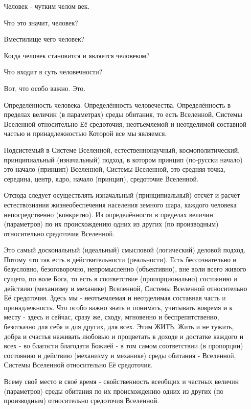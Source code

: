\begin{itemize}
Человек - чутким челом век.

Что это значит, человек?

Вместилище чего человек?

Когда человек становится и является человеком?

Что входит в суть человечности?

Вот, что особо важно. Это.

Определённость человека. Определённость человечества. Определённость в пределах
величин (в параметрах) среды обитания, то есть Вселенной, Системы Вселенной
относительно Её средоточия, неотъемлемой и неотделимой составной частью и
принадлежностью Которой все мы являемся.

Подсистемый в Системе Вселенной, естественнонаучный, космополитический,
принципиальный (изначальный) подход, в котором принцип (по-русски начало) это
начало (принцип) Вселенной, Системы Вселенной, это средняя точка, середина,
центр, ядро, начало (принцип), средоточие Вселенной.

Отсюда следует осуществлять изначальный (принципиальный) отсчёт и расчёт
естествознания жизнеобеспечения населения земного шара, каждого человека
непосредственно (конкретно). Из определённости в пределах величин (параметров)
по их происхождению одних из других (по производным) относительно средоточия
Вселенной.

Это самый доскональный (идеальный) смысловой (логический) деловой подход.
Потому что так есть в действительности (реальности). Есть бессознательно и
безусловно, безоговорочно, непромысленно (объективно), вне воли всего живого
сущего, по воле Бога, то есть в соответствие (пропорционально) состоянию и
действию (механизму и механике) Вселенной, Системы Вселенной относительно Её
средоточия. Здесь мы - неотъемлемая и неотделимая составная часть и
принадлежность. Что особо важно знать и понимать, учитывать вовремя и к месту -
здесь и сейчас, сразу же, сходу, мгновенно и беспрепятственно, безотказно для
себя и для других, для всех. Этим ЖИТЬ. Жить и не тужить, добра и счастья
наживать любовью и процветать в доходе и достатке каждого и всех - во благости
благодати Божией - в том самом соответствии (в пропорции) состоянию и действию
(механизму и механике) среды обитания - Вселенной, Системы Вселенной
относительно Её средоточия.

Всему своё место в своё время - свойственность всеобщих и частных величин
(параметров) среды обитания по их происхождению одних из других (по
производным) относительно средоточия Вселенной.


\end{itemize}
